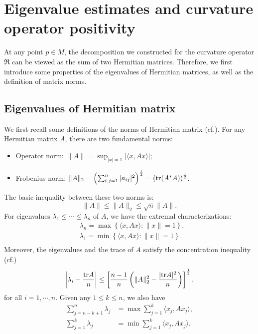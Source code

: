 \documentclass[12pt, twoside]{article}
\theoremstyle{definition}
\numberwithin{equation}{section}
\def \la {\lambda}
\begin{document}
\section{Eigenvalue estimates and curvature operator positivity}
At any point $p\in M$, the decomposition we constructed for the curvature operator $\mathfrak{R}$ can be viewed as the sum of two Hermitian matrices. Therefore, we first introduce some properties of the eigenvalues of Hermitian matrices, as well as the definition of matrix norms.
\subsection{Eigenvalues of Hermitian matrix}
We first recall some definitions of the norms of Hermitian matrix (cf.\cite{Bha97,HJ12}). For any Hermitian matrix $A$, there are two fundamental norms:
\begin{itemize}
	\item Operator norm: $\|A\|=\sup_{|x|=1}|\langle x,Ax\rangle|$;
	\item Frobenius norm: $\|A\|_{2}=\left(\sum_{i,j=1}^{n}|a_{ij}|^{2}\right)^{\frac{1}{2}}=\left({\rm{tr}}(A^{\ast}A)\right)^{\frac{1}{2}}$.
\end{itemize}
The basic inequality between these two norms is:
$$\|A\|\leq\|A\|_{2}\leq\sqrt{n}\|A\|.$$
For eigenvalues $\la_{1}\leq\cdots\leq\la_{n}$ of $A$, we have the extremal characterizations:
\begin{equation*}
\begin{split}
&\la_{n}=\max\left\{\langle x,Ax\rangle:\|x\|=1 \right\},\\
&\la_{1}=\min\left\{\langle x,Ax\rangle:\|x\|=1 \right\}.\\
\end{split}
\end{equation*}
Moreover, the eigenvalues and the trace of $A$ satisfy the concentration inequality (cf.\cite[Page 24]{BG64})
\begin{equation*}
\left|\la_{i}-\frac{{\rm{tr}} A}{n}\right|\leq \left[\frac{n-1}{n}\left(\|A\|^{2}_{2}-\frac{|{\rm{tr}} A|^{2}}{n} \right) \right]^{\frac{1}{2}},
\end{equation*}
for all $i=1,\cdots,n$. Given any $1\leq k\leq n$, we also have
\begin{align}
\sum_{j=n-k+1}^{n}\la_{j}&=\max\sum_{j=1}^{k}\langle x_{j},Ax_{j}\rangle,\label{uppernk} \\
\sum_{j=1}^{k}\la_{j}&=\min\sum_{j=1}^{k}\langle x_j,Ax_j\rangle,\label{lowerk}
\end{align}
\end{document}
